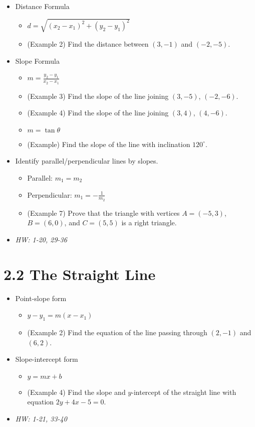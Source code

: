 \documentclass[11pt]{article}
\begin{document}
\begin{itemize}
\item Distance Formula
  \begin{itemize}
    \item \(d=\sqrt{(x_2-x_1)^2+(y_2-y_1)^2}\)
    \item (Example 2) Find the distance between \((3,-1)\) and \((-2,-5)\).
  \end{itemize}
\item Slope Formula
  \begin{itemize}
    \item \(m=\frac{y_2-y_1}{x_2-x_1}\)
    \item (Example 3) Find the slope of the line joining
          \((3,-5)\), \((-2,-6)\).
    \item (Example 4) Find the slope of the line joining
          \((3,4)\), \((4,-6)\).
    \item \(m=\tan\theta\)
    \item (Example) Find the slope of the line with inclination \(120^\circ\).
  \end{itemize}
\item Identify parallel/perpendicular lines by slopes.
  \begin{itemize}
    \item Parallel: \(m_1=m_2\)
    \item Perpendicular: \(m_1=-\frac{1}{m_2}\)
    \item (Example 7) Prove that the triangle with vertices
          \(A=(-5,3)\), \(B=(6,0)\), and \(C=(5,5)\) is a right triangle.
  \end{itemize}
\item\textit{
  HW: 1-20, 29-36
}
\end{itemize}

\section*{2.2 The Straight Line}

\begin{itemize}
\item Point-slope form
  \begin{itemize}
    \item \(y-y_1=m(x-x_1)\)
    \item (Example 2) Find the equation of the line passing through
          \((2,-1)\) and \((6,2)\).
  \end{itemize}
\item Slope-intercept form
  \begin{itemize}
    \item \(y=mx+b\)
    \item (Example 4) Find the slope and \(y\)-intercept of the straight line
          with equation \(2y+4x-5=0\).
  \end{itemize}
\item\textit{
  HW: 1-21, 33-40
}
\end{itemize}
\end{document}

